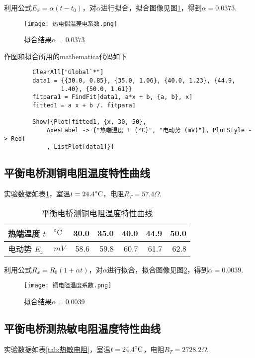 \documentclass[11pt]{article}
\newcommand*{\mcelsius}{\unit{\prescript{\circ}{}C}}
\begin{document}
	利用公式$E_x=\alpha(t-t_0)$，对$\alpha$进行拟合，拟合图像见图\ref{fig:热电偶}，得到$\alpha=0.0373$.
	\begin{figure}[htbp]
		\centering
		\texttt{[image: 热电偶温差电系数.png]}
		\caption{拟合结果$\alpha=0.0373$}
		\label{fig:热电偶}
	\end{figure}
	
	作图和拟合所用的mathematica代码如下
	\begin{lstlisting} 
		ClearAll["Global`*"]
		data1 = {{30.0, 0.85}, {35.0, 1.06}, {40.0, 1.23}, {44.9, 
				1.40}, {50.0, 1.61}}
		fitpara1 = FindFit[data1, a*x + b, {a, b}, x]
		fitted1 = a x + b /. fitpara1
		
		Show[{Plot[fitted1, {x, 30, 50}, 
			AxesLabel -> {"热端温度 t (°C)", "电动势 (mV)"}, PlotStyle -> Red]
			, ListPlot[data1]}]
	\end{lstlisting}
	
	
	
	\subsection{平衡电桥测铜电阻温度特性曲线}
	实验数据如表\ref{tab:铜电阻}，室温$t=24.4\mcelsius$，电阻$R_T=57.4\Omega$.
	\begin{table}[htbp]
	\centering
	\caption{平衡电桥测铜电阻温度特性曲线}
	\begin{tabular}{|l|l|r|r|r|r|r|}
		\hline
		热端温度 $t$   & $\mcelsius$  & 30.0    &   35.0    & 40.0    & 44.9    & 50.0  \bigstrut\\
		\hline
		电动势 $E_x$   & $\unit{mV}$ & 58.6   & 59.8   & 60.7   & 61.7   & 62.8  \bigstrut\\
		\hline
	\end{tabular}%
	\label{tab:铜电阻}%
	\end{table}%
	
	利用公式$R_x=R_0(1+\alpha t)$，对$\alpha$进行拟合，拟合图像见图\ref{fig:铜电阻}，得到$\alpha=0.0039$.
	
	\begin{figure}[htbp]
	\centering
	\texttt{[image: 铜电阻温度系数.png]}
	\caption{拟合结果$\alpha=0.0039$}
	\label{fig:铜电阻}
	\end{figure}
	
	
	
	\subsection{平衡电桥测热敏电阻温度特性曲线}
	实验数据如表\ref{tab:热敏电阻}，室温$t=24.4\mcelsius$，电阻$R_T=2728.2\Omega$.
\end{document}
